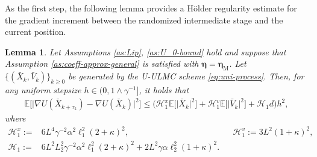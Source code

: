 \documentclass[12pt]{article}
\numberwithin{equation}{section}
\renewcommand{\H}{\mathcal{H}}
\newtheorem{lem}{Lemma}[section]
\begin{document}
%
%
As the first step, the following lemma provides a H\"older regularity estimate for the gradient increment between the randomized intermediate stage and the current position.

\begin{lem}\label{lem:nabla-tau-delta}
Let Assumptions \ref{as:Lip}, \ref{as:U_0-bound} hold and suppose that Assumption \ref{as:coeff-approx-general} is satisfied with $\boldsymbol{\eta}=\boldsymbol{\eta}_{\mathrm M}$. Let $\{(\bar{X}_k,\bar{V}_k)\}_{k\geq0}$ be generated by the U-ULMC scheme \eqref{eq:uni-process}. Then, for any uniform stepsize $h\in(0,1\wedge\gamma^{-1}]$, it holds that 
\begin{equation}
\begin{aligned}
  \mathbb{E}
\Big[\big|
\nabla U(\bar{X}_{k+\tau_k})
-
\nabla U(\bar{X}_{k})
\big|^2\Big]  
\leq   
\Big( 
\H^{x}_1
\mathbb{E}
\Big[\big|
\bar{X}_k
\big|^2\Big]
+
\H^{v}_1
\mathbb{E}
\Big[\big|
\bar{V}_k
\big|^2\Big]
+
\H_1
d
\Big)h^2,
\end{aligned}
\end{equation}
where 
\begin{equation}
\begin{aligned}
\H^{x}_1
:=   &
6L^4
\gamma^{-2}
\alpha^2
\ell_1^2
(2 +  \kappa)^2,
& &
\H^{v}_1
:=   
3L^2(1+\kappa)^2,
\\
\H_1
:=   &
6L^2L_2^2
\gamma^{-2}
\alpha^2
\ell_1^2
(2 +  \kappa)^2
+
2L^2
\gamma\alpha\ell_2^2(1+\kappa)^2.
\end{aligned}
\end{equation}
\end{lem}
\end{document}
